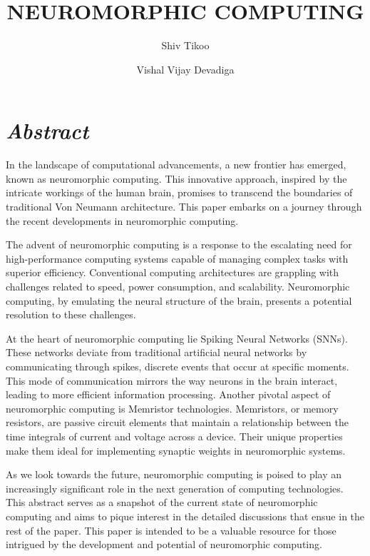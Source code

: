 \documentclass[screen, acmtog]{acmart}
\begin{document}
\title{NEUROMORPHIC COMPUTING}

\author{Shiv Tikoo}

\author{Vishal Vijay Devadiga}



\maketitle

\section{\textit{Abstract}}In the landscape of computational advancements, a new frontier has emerged, known as neuromorphic computing. This innovative approach, inspired by the intricate workings of the human brain, promises to transcend the boundaries of traditional Von Neumann architecture. This paper embarks on a journey through the recent developments in neuromorphic computing.

The advent of neuromorphic computing is a response to the escalating need for high-performance computing systems capable of managing complex tasks with superior efficiency. Conventional computing architectures are grappling with challenges related to speed, power consumption, and scalability. Neuromorphic computing, by emulating the neural structure of the brain, presents a potential resolution to these challenges.

At the heart of neuromorphic computing lie Spiking Neural Networks (SNNs). These networks deviate from traditional artificial neural networks by communicating through spikes, discrete events that occur at specific moments. This mode of communication mirrors the way neurons in the brain interact, leading to more efficient information processing. Another pivotal aspect of neuromorphic computing is Memristor technologies. Memristors, or memory resistors, are passive circuit elements that maintain a relationship between the time integrals of current and voltage across a device. Their unique properties make them ideal for implementing synaptic weights in neuromorphic systems.

As we look towards the future, neuromorphic computing is poised to play an increasingly significant role in the next generation of computing technologies. This abstract serves as a snapshot of the current state of neuromorphic computing and aims to pique interest in the detailed discussions that ensue in the rest of the paper. This paper is intended to be a valuable resource for those intrigued by the development and potential of neuromorphic computing.
\end{document}

